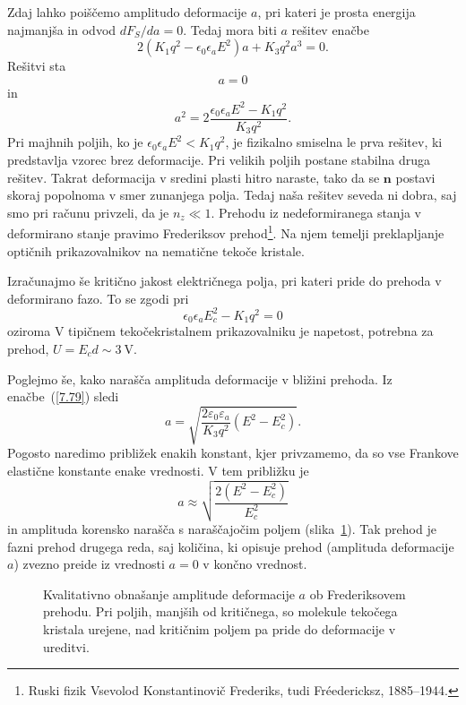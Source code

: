 Zdaj lahko poiščemo amplitudo deformacije $a$, pri kateri je prosta energija
najmanjša in odvod $dF_S/da=0$. Tedaj mora biti $a$ rešitev enačbe 
\begin{equation}
2(K_{1}q^{2}-\epsilon_{0}\epsilon_{a}E^2)a+K_{3}q^{2}a^{3}=0.
\label{7.78}
\end{equation}
 Rešitvi sta 
\begin{equation}
a=0
\end{equation}
in
\begin{equation}
a^{2}=2\frac{\epsilon_{0}\epsilon_{a}E^2-K_{1}q^{2}}{K_{3}q^{2}}.
\label{7.79}
\end{equation}
 Pri majhnih poljih, ko je $\epsilon_{0}\epsilon_{a}E^2<K_{1}q^{2}$,
je fizikalno smiselna le prva rešitev, ki predstavlja vzorec brez deformacije. Pri 
velikih poljih postane stabilna druga rešitev. Takrat deformacija
v sredini plasti hitro naraste, tako da se $\mathbf{n}$ postavi skoraj
popolnoma v smer zunanjega polja. Tedaj naša rešitev seveda ni dobra,
saj smo pri računu privzeli, da je $n_{z}\ll1$. Prehodu iz nedeformiranega
stanja v deformirano stanje pravimo  Frederiksov prehod\footnote{Ruski fizik
Vsevolod Konstantinovič Frederiks, tudi Fr\'{e}edericksz, 1885--1944.}. Na njem
temelji preklapljanje optičnih prikazovalnikov na nematične tekoče kristale.

Izračunajmo še kritično jakost električnega polja, pri kateri pride do prehoda v deformirano fazo.
To se zgodi pri 
\begin{equation}
\epsilon_{0}\epsilon_{a}E_c^2-K_{1}q^{2} = 0
\end{equation}
oziroma
V tipičnem tekočekristalnem prikazovalniku je napetost, potrebna za prehod, $U = E_cd \sim 3~\si{\volt}$. 

Poglejmo še, kako narašča amplituda deformacije v bližini prehoda. Iz enačbe~(\ref{7.79})
sledi 
\begin{equation}
a = \sqrt{\frac{2 \varepsilon_0 \varepsilon_a}{K_3 q^2 }(E^2-E_c^2)}.
\end{equation}
Pogosto naredimo približek enakih konstant, kjer privzamemo, da so vse Frankove 
elastične konstante enake vrednosti. V tem približku je 
\begin{equation}
a \approx \sqrt{\frac{2(E^2-E_c^2)}{E_c^2}}
\end{equation}
in amplituda korensko narašča s naraščajočim poljem (slika~\ref{Fred}). Tak prehod je
fazni prehod drugega reda, saj količina, ki opisuje prehod (amplituda deformacije $a$)
zvezno preide iz vrednosti $a=0$ v končno vrednost. 
\begin{figure}[h]
\centering
\def\svgwidth{70truemm} 

\caption{Kvalitativno obnašanje amplitude deformacije $a$ ob Frederiksovem prehodu. Pri poljih, 
manjših od kritičnega, so molekule tekočega kristala urejene, nad kritičnim poljem
pa pride do deformacije v ureditvi.}
\label{Fred}
\end{figure}

